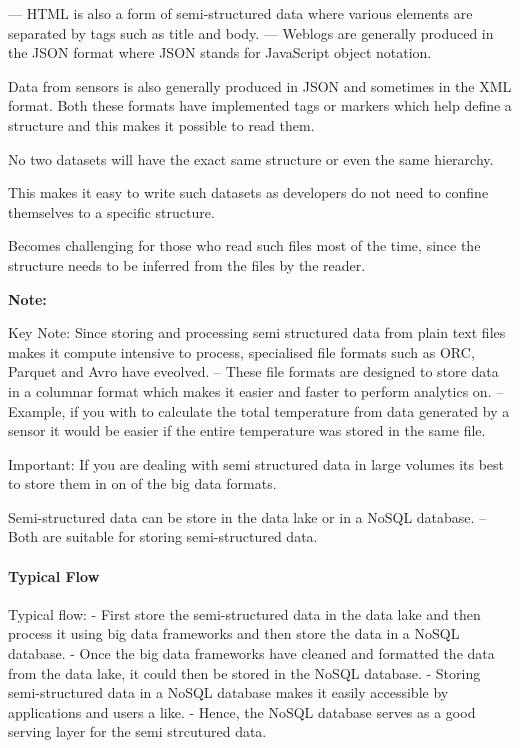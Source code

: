 \documentclass[a4paper, 11pt]{article}
\newenvironment{note}{
    \begin{siderule}
        \textbf{Note: }
        }{
    \end{siderule}}
\begin{document}
    --- HTML is also a form of semi-structured data where various elements are separated by tags such as title and body.
    --- Weblogs are generally produced in the JSON format where JSON stands for JavaScript object notation.

    Data from sensors is also generally produced in JSON and sometimes in the XML format.
    Both these formats have implemented tags or markers which help define a structure and this makes it possible to read them.

    No two datasets will have the exact same structure or even the same hierarchy.

    This makes it easy to write such datasets as developers do not need to confine themselves to a specific structure.

    Becomes challenging for those who read such files most of the time, since the structure needs to be inferred from the files by the reader.

    \begin{note}
        Key Note: Since storing and processing semi structured data from plain text files makes it compute intensive to process, specialised file formats such as ORC, Parquet and Avro have eveolved.
        -- These file formats are designed to store data in a columnar format which makes it easier and faster to perform analytics on.
        -- Example, if you with to calculate the total temperature from data generated by a sensor it would be easier if the entire temperature was stored in the same file.
    \end{note}

    Important: If you are dealing with semi structured data in large volumes its best to store them in on of the big data formats.

    Semi-structured data can be store in the data lake or in a NoSQL database.
    -- Both are suitable for storing semi-structured data.

    \paragraph{Typical Flow}
    Typical flow:
    - First store the semi-structured data in the data lake and then process it using big data frameworks and then store the data in a NoSQL database.
    - Once the big data frameworks have cleaned and formatted the data from the data lake, it could then be stored in the NoSQL database.
    - Storing semi-structured data in a NoSQL database makes it easily accessible by applications and users a like.
    - Hence, the NoSQL database serves as a good serving layer for the semi strcutured data.
\end{document}
